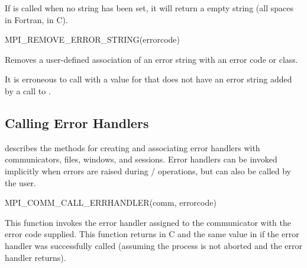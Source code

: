 If  is called when no string has been set,
it will return a empty string (all spaces in Fortran,  in C).


\begin{funcdef}{MPI\_REMOVE\_ERROR\_STRING}{(\mbox{errorcode})}
\end{funcdef}

Removes a user-defined association of an error string with an error code or class.

It is erroneous to call  with a value for
 that does not have an error string added by a call to
.


\subsection{Calling Error Handlers}

 describes the methods for creating
and associating error handlers with communicators, files, windows, and sessions.
Error handlers can be invoked implicitly when errors are raised during
\mpi/ operations, but can also be called by the user.

\begin{funcdef}{MPI\_COMM\_CALL\_ERRHANDLER}{(\mbox{comm}, \mbox{errorcode})}
\end{funcdef}

This function invokes the error handler assigned to the communicator
with the error code supplied.  
This function returns  in C and the same
value in  if the error handler was successfully called
(assuming the process is not aborted and the error handler returns).

